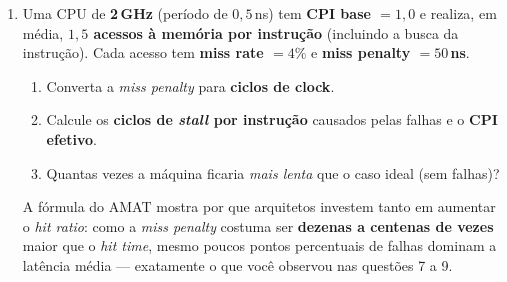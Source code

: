 \documentclass[10pt, a4paper]{article}
\begin{document}
\begin{enumerate}
\item Uma CPU de \textbf{2\,GHz} (per\'{i}odo de $0{,}5$\,ns) tem \textbf{CPI base $=1{,}0$} e realiza, em m\'{e}dia, \textbf{$1{,}5$ acessos \`{a} mem\'{o}ria por instru\c{c}\~{a}o} (incluindo a busca da instru\c{c}\~{a}o). Cada acesso tem \textbf{miss rate $=4\%$} e \textbf{miss penalty $=50$\,ns}.
\begin{enumerate}
  \item Converta a \emph{miss penalty} para \textbf{ciclos de clock}.
  \item Calcule os \textbf{ciclos de \emph{stall} por instru\c{c}\~{a}o} causados pelas falhas e o \textbf{CPI efetivo}.
  \item Quantas vezes a m\'{a}quina ficaria \emph{mais lenta} que o caso ideal (sem falhas)?
\end{enumerate}

\begin{curiosidade}
A f\'{o}rmula do AMAT mostra por que arquitetos investem tanto em aumentar o \emph{hit ratio}: como a \emph{miss penalty} costuma ser \textbf{dezenas a centenas de vezes} maior que o \emph{hit time}, mesmo poucos pontos percentuais de falhas dominam a lat\^{e}ncia m\'{e}dia --- exatamente o que voc\^{e} observou nas quest\~{o}es 7 a 9.
\end{curiosidade}

\end{enumerate}
\end{document}
